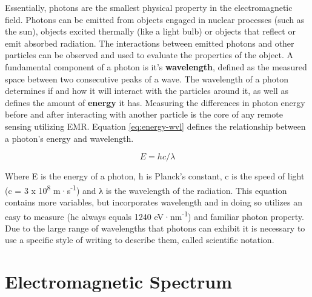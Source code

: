 \documentclass[
]{book}
\begin{document}
Essentially, photons are the smallest physical property in the
electromagnetic field. Photons can be emitted from objects engaged in
nuclear processes (such as the sun), objects excited thermally (like a
light bulb) or objects that reflect or emit absorbed radiation. The
interactions between emitted photons and other particles can be observed
and used to evaluate the properties of the object. A fundamental
component of a photon is it's \textbf{wavelength}, defined as the measured
space between two consecutive peaks of a wave. The wavelength of a
photon determines if and how it will interact with the particles around
it, as well as defines the amount of \textbf{energy} it has. Measuring the
differences in photon energy before and after interacting with
another particle is the core of any remote sensing utilizing EMR.
Equation \eqref{eq:energy-wvl} defines the relationship between a
photon's energy and wavelength.

\begin{equation}
E = hc/λ 
\label{eq:energy-wvl}
\end{equation}

Where E is the energy of a photon, h is Planck's constant, c is the
speed of light (c = 3 x 10\textsuperscript{8} m·s\textsuperscript{-1}) and λ is the wavelength of the
radiation. This equation contains more variables, but incorporates
wavelength and in doing so utilizes an easy to measure (hc always equals
1240 eV·nm\textsuperscript{-1}) and familiar photon property. Due to the large range of
wavelengths that photons can exhibit it is necessary to use a specific
style of writing to describe them, called scientific notation.

\hypertarget{electromagnetic-spectrum}{%
\section{Electromagnetic Spectrum}\label{electromagnetic-spectrum}}
\end{document}
